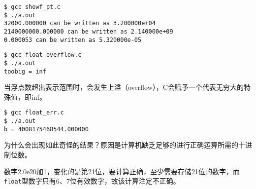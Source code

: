 \begin{frame}[fragile]

\end{frame}

\begin{frame}[fragile] 
\begin{lstlisting}
$ gcc showf_pt.c
$ ./a.out
32000.000000 can be written as 3.200000e+04
2140000000.000000 can be written as 2.140000e+09
0.000053 can be written as 5.320000e-05
\end{lstlisting}
\end{frame}
%
\begin{frame}[fragile]

\end{frame}
%
\begin{frame}[fragile]\begin{lstlisting}
$ gcc float_overflow.c
$ ./a.out
toobig = inf
\end{lstlisting}

\end{frame}
%
\begin{frame}[fragile]
当浮点数超出表示范围时，会发生上溢（overflow），C会赋予一个代表无穷大的特殊值，即inf。

\end{frame}
%
\begin{frame}[fragile]

\end{frame}
%
\begin{frame}[fragile]
\begin{lstlisting}
$ gcc float_err.c
$ ./a.out
b = 4008175468544.000000
\end{lstlisting}
\end{frame}
%
\begin{frame}[fragile]
为什么会出现如此奇怪的结果？原因是计算机缺乏足够的进行正确运算所需的十进制位数。
\vspace{0.1in}

数字2.0e20加1，变化的是第21位，要计算正确，至少需要存储21位的数字，而\lstinline|float|型数字只有6、7位有效数字，故该计算注定不正确。
\end{frame}
%
